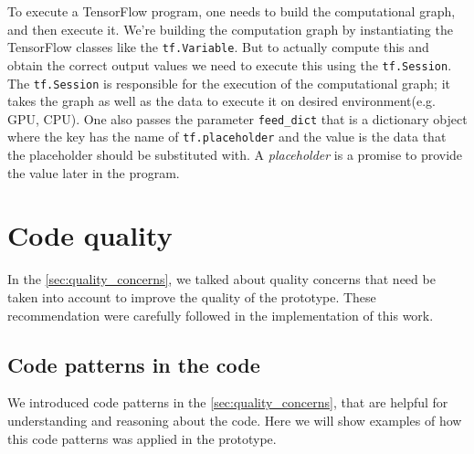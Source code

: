 To execute a TensorFlow program, one needs to build the computational graph,
and then execute it. We're building
the computation graph by instantiating the TensorFlow classes like the
\lstinline{tf.Variable}. But to actually compute this and obtain the correct output values
we need to execute this using the \lstinline{tf.Session}. The \lstinline{tf.Session}
is
responsible for the execution of the computational graph; it takes the graph
as well as the data
to execute it on desired environment(e.g. GPU, CPU). One also passes the parameter
\lstinline{feed_dict} that is a dictionary object where the key has the name of
\lstinline{tf.placeholder} and the value is the data that the placeholder should be substituted
with. A \emph{placeholder} is a promise to provide the value later in the program.


%

\section{Code quality}
In the \autoref{sec:quality_concerns}, we talked about quality concerns
that need be taken into account to improve the quality of the prototype.
These recommendation were carefully followed in the implementation of this work.

\subsection{Code patterns in the code} We introduced code patterns in the
\autoref{sec:quality_concerns}, that are
helpful for understanding and reasoning about the code. Here we will show
examples of how this code patterns was applied in the prototype.

